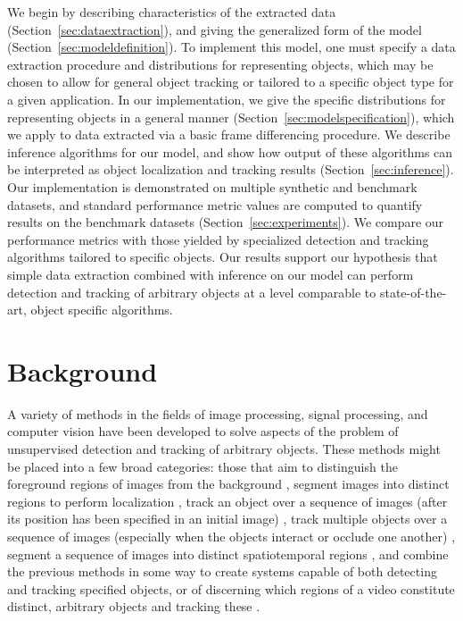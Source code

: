 \documentclass[twocolumn, final]{svjour3}
\begin{document}
We begin by describing characteristics of the extracted data (Section~\ref{sec:dataextraction}), and giving the generalized form of the model (Section~\ref{sec:modeldefinition}). To implement this model, one must specify a data extraction procedure and distributions for representing objects, which may be chosen to allow for general object tracking or tailored to a specific object type for a given application. In our implementation, we give the specific distributions for representing objects in a general manner (Section~\ref{sec:modelspecification}), which we apply to data extracted via a basic frame differencing procedure. We describe inference algorithms for our model, and show how output of these algorithms can be interpreted as object localization and tracking results (Section~\ref{sec:inference}). Our implementation is demonstrated on multiple synthetic and benchmark datasets, and standard performance metric values are computed to quantify results on the benchmark datasets (Section~\ref{sec:experiments}). We compare our performance metrics with those yielded by specialized detection and tracking algorithms tailored to specific objects. Our results support our hypothesis that simple data extraction combined with inference on our model can perform detection and tracking of arbitrary objects at a level comparable to state-of-the-art, object specific algorithms.




\section{Background}
\label{sec:priorwork}

A variety of methods in the fields of image processing, signal processing, and computer vision have been developed to solve aspects of the problem of unsupervised detection and tracking of arbitrary objects. These methods might be placed into a few broad categories: those that aim to distinguish the foreground regions of images from the background \cite{hong2007real,chien2002efficient, zhang2007moving, kim2002fast}, segment images into distinct regions to perform localization \cite{jain1997object, fei2005bayesian, sivic2005discovering}, track an object over a sequence of images (after its position has been specified in an initial image) \cite{raja_1998, mckenna_1999, jepson_2003, comaniciu_2003, perez_2002}, track multiple objects over a sequence of images (especially when the objects interact or occlude one another) \cite{senior2006appearance, cucchiara2004probabilistic, zhou2003background, han_2004, mckenna2000tracking, dockstader2001multiple}, segment a sequence of images into distinct spatiotemporal regions \cite{brox2003unsupervised, sista2000unsupervised, wang1998unsupervised}, and combine the previous methods in some way to create systems capable of both detecting and tracking specified objects, or of discerning which regions of a video constitute distinct, arbitrary objects and tracking these \cite{brostow2006unsupervised, brox2010object, fragkiadaki2011detection, pece_2002}.
\end{document}
